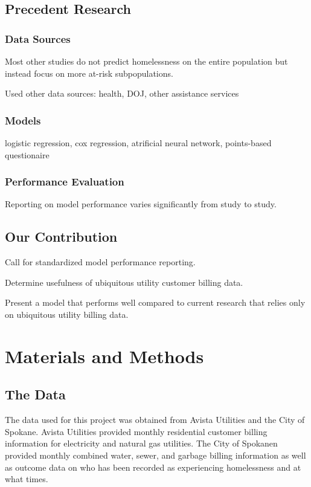 \documentclass[10pt,letterpaper]{article}
\begin{document}
\subsection*{Precedent Research}
\subsubsection*{Data Sources}
Most other studies do not predict homelessness on the entire population but instead focus on more at-risk subpopulations. 

Used other data sources: health, DOJ, other assistance services

\subsubsection*{Models}
logistic regression, cox regression, atrificial neural network, points-based questionaire

\subsubsection*{Performance Evaluation}
Reporting on model performance varies significantly from study to study.

\subsection*{Our Contribution}
Call for standardized model performance reporting. 

Determine usefulness of ubiquitous utility customer billing data.

Present a model that performs well compared to current research that relies only on ubiquitous utility billing data.


\section*{Materials and Methods}
\subsection*{The Data}
The data used for this project was obtained from Avista Utilities and the City of Spokane. Avista Utilities provided monthly residential customer billing information for electricity and natural gas utilities. The City of Spokanen provided monthly combined water, sewer, and garbage billing information as well as outcome data on who has been recorded as experiencing homelessness and at what times.
\end{document}

